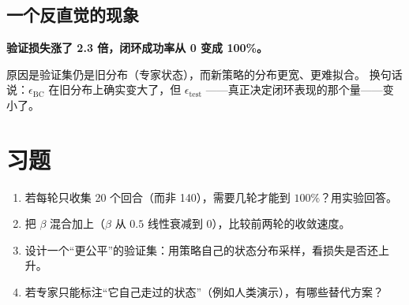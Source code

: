\subsection{一个反直觉的现象}

\textbf{验证损失涨了 2.3 倍，闭环成功率从 0 变成 100\%。}

原因是验证集仍是旧分布（专家状态），而新策略的分布更宽、更难拟合。
换句话说：$\epsilon_{\mathrm{BC}}$ 在旧分布上确实变大了，但 $\epsilon_{\mathrm{test}}$
——真正决定闭环表现的那个量——变小了。


\section{习题}
\begin{enumerate}[leftmargin=1.6em,itemsep=4pt]
  \item 若每轮只收集 20 个回合（而非 140），需要几轮才能到 $100\%$？用实验回答。
  \item 把 $\beta$ 混合加上（$\beta$ 从 $0.5$ 线性衰减到 $0$），比较前两轮的收敛速度。
  \item 设计一个“更公平”的验证集：用策略自己的状态分布采样，看损失是否还上升。
  \item 若专家只能标注“它自己走过的状态”（例如人类演示），有哪些替代方案？
\end{enumerate}
